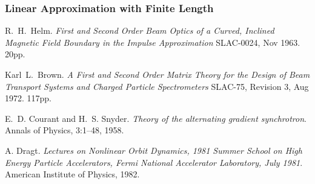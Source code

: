 \documentclass{report}
\begin{document}
\subsubsection{Linear Approximation with Finite Length}


\clearpage
\begin{thebibliography}{99}

  R.~H.~Helm.
  {\sl First and Second Order Beam Optics of a Curved, Inclined Magnetic
    Field Boundary in the Impulse Approximation}
  SLAC-0024, Nov 1963. 20pp. 

  Karl~L.~Brown.
  {\sl A First and Second Order Matrix Theory for the Design of Beam
  Transport Systems and Charged Particle Spectrometers}
  SLAC-75, Revision 3, Aug 1972. 117pp. 

  E.~D. Courant and H.~S. Snyder.
  {\sl Theory of the alternating gradient synchrotron}.
  Annals of Physics, 3:1--48, 1958.
  
  A. Dragt.
  {\sl Lectures on Nonlinear Orbit Dynamics, 1981 Summer School on High
    Energy Particle Accelerators, Fermi National Accelerator Laboratory,
    July 1981}.
  American Institute of Physics, 1982.

\end{thebibliography}
\end{document}
